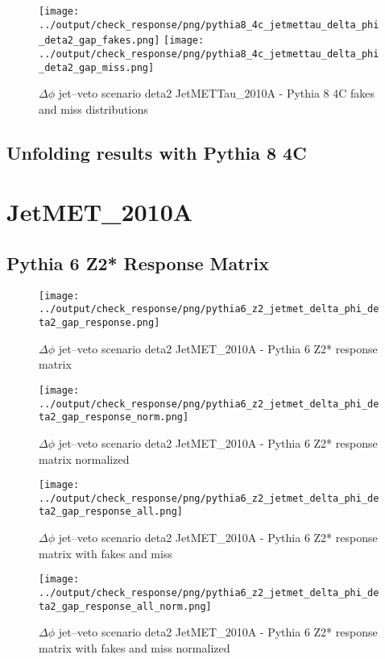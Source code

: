 \documentclass[11pt]{book}
\begin{document}
\begin{figure}[ht]
\centering
\texttt{[image: ../output/check\_response/png/pythia8\_4c\_jetmettau\_delta\_phi\_deta2\_gap\_fakes.png]}
\texttt{[image: ../output/check\_response/png/pythia8\_4c\_jetmettau\_delta\_phi\_deta2\_gap\_miss.png]}
\caption{$\Delta\phi$ jet--veto scenario deta2 JetMETTau\_2010A - Pythia 8 4C fakes and miss distributions}
\label{p8_jetmettau_delta_phi_deta2_gap_fakesmiss}
\end{figure}


\clearpage
\subsection{Unfolding results with Pythia 8 4C}


\section{JetMET\_2010A}
\subsection{Pythia 6 Z2* Response Matrix}

\begin{figure}[ht]
\centering
\texttt{[image: ../output/check\_response/png/pythia6\_z2\_jetmet\_delta\_phi\_deta2\_gap\_response.png]}
\caption{$\Delta\phi$ jet--veto scenario deta2 JetMET\_2010A - Pythia 6 Z2* response matrix}
\label{p6_jetmet_delta_phi_deta2_gap_response}
\end{figure}

\begin{figure}[ht]
\centering
\texttt{[image: ../output/check\_response/png/pythia6\_z2\_jetmet\_delta\_phi\_deta2\_gap\_response\_norm.png]}
\caption{$\Delta\phi$ jet--veto scenario deta2 JetMET\_2010A - Pythia 6 Z2* response matrix normalized}
\label{p6_jetmet_delta_phi_deta2_gap_response_norm}
\end{figure}

\begin{figure}[ht]
\centering
\texttt{[image: ../output/check\_response/png/pythia6\_z2\_jetmet\_delta\_phi\_deta2\_gap\_response\_all.png]}
\caption{$\Delta\phi$ jet--veto scenario deta2 JetMET\_2010A - Pythia 6 Z2* response matrix with fakes and miss}
\label{p6_jetmet_delta_phi_deta2_gap_response_all}
\end{figure}

\begin{figure}[ht]
\centering
\texttt{[image: ../output/check\_response/png/pythia6\_z2\_jetmet\_delta\_phi\_deta2\_gap\_response\_all\_norm.png]}
\caption{$\Delta\phi$ jet--veto scenario deta2 JetMET\_2010A - Pythia 6 Z2* response matrix with fakes and miss normalized}
\label{p6_jetmet_delta_phi_deta2_gap_response_all_norm}
\end{figure}
\end{document}
